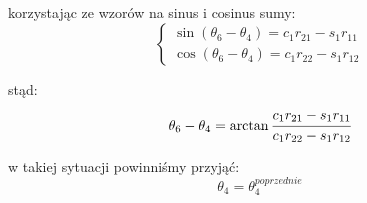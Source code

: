 \documentclass[]{article}
\begin{document}
korzystając ze wzorów na sinus i cosinus sumy:
\begin{equation}\left\{\begin{array}{l}
\sin(\theta_6 - \theta_4) = c_1r_{21} - s_1r_{11} \\
\cos(\theta_6 - \theta_4) = c_1r_{22} - s_1r_{12}
\end{array}\right.\end{equation}

stąd:
\begin{equation}
\theta_6 - \theta_4 = \arctan\cfrac{c_1r_{21} - s_1r_{11}}{c_1r_{22} - s_1r_{12}}
\end{equation}

w takiej sytuacji powinniśmy przyjąć:
\begin{equation}
\theta_4 = \theta_4^{poprzednie}
\end{equation}
\end{document}
